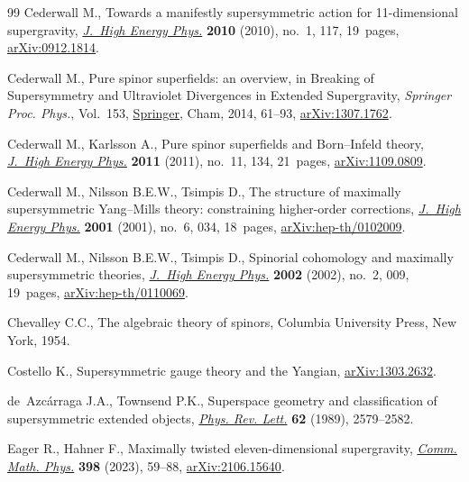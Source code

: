 \documentclass[pdftex]{sigma}
\numberwithin{equation}{section}
\begin{document}
\begin{thebibliography}{99}
Cederwall M., Towards a manifestly supersymmetric action for 11-dimensional
 supergravity, \href{https://doi.org/10.1007/JHEP01(2010)117}{\textit{J.~High Energy Phys.}} \textbf{2010} (2010), no.~1, 117,
 19~pages, \href{https://arxiv.org/abs/0912.1814}{arXiv:0912.1814}.

Cederwall M., Pure spinor superfields: an overview, in Breaking of
 Supersymmetry and Ultraviolet Divergences in Extended Supergravity,
 \textit{Springer Proc. Phys.}, Vol.~153, \href{https://doi.org/10.1007/978-3-319-03774-5_4}{Springer}, Cham,
 2014, 61--93, \href{https://arxiv.org/abs/1307.1762}{arXiv:1307.1762}.

Cederwall M., Karlsson A., Pure spinor superfields and {B}orn--{I}nfeld theory,
 \href{https://doi.org/10.1007/JHEP11(2011)134}{\textit{J.~High Energy Phys.}} \textbf{2011} (2011), no.~11, 134, 21~pages,
 \href{https://arxiv.org/abs/1109.0809}{arXiv:1109.0809}.

Cederwall M., Nilsson B.E.W., Tsimpis D., The structure of maximally
 supersymmetric {Y}ang--{M}ills theory: constraining higher-order corrections,
 \href{https://doi.org/10.1088/1126-6708/2001/06/034}{\textit{J.~High Energy Phys.}} \textbf{2001} (2001), no.~6, 034, 18~pages,
 \href{https://arxiv.org/abs/hep-th/0102009}{arXiv:hep-th/0102009}.

Cederwall M., Nilsson B.E.W., Tsimpis D., Spinorial cohomology and maximally
 supersymmetric theories, \href{https://doi.org/10.1088/1126-6708/2002/02/009}{\textit{J.~High Energy Phys.}} \textbf{2002} (2002),
 no.~2, 009, 19~pages, \href{https://arxiv.org/abs/hep-th/0110069}{arXiv:hep-th/0110069}.

Chevalley C.C., The algebraic theory of spinors, Columbia University Press, New
 York, 1954.

Costello K., Supersymmetric gauge theory and the {Y}angian, \href{https://arxiv.org/abs/1303.2632}{arXiv:1303.2632}.

de~Azc\'arraga J.A., Townsend P.K., Superspace geometry and classification of
 supersymmetric extended objects, \href{https://doi.org/10.1103/PhysRevLett.62.2579}{\textit{Phys. Rev. Lett.}} \textbf{62}
 (1989), 2579--2582.

Eager R., Hahner F., Maximally twisted eleven-dimensional supergravity,
 \href{https://doi.org/10.1007/s00220-022-04516-5}{\textit{Comm. Math. Phys.}} \textbf{398} (2023), 59--88, \href{https://arxiv.org/abs/2106.15640}{arXiv:2106.15640}.


\end{thebibliography}
\end{document}
